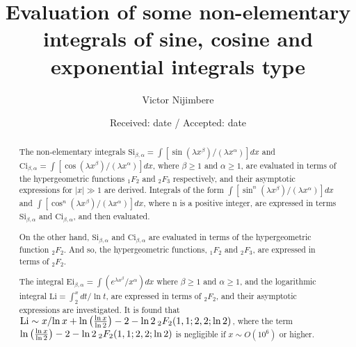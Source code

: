 \documentclass[smallextended]{svjour3}
\begin{document}
\title{Evaluation of some non-elementary integrals of sine, cosine and exponential integrals type}



\author{Victor Nijimbere}



\date{Received: date / Accepted: date}


\maketitle

\begin{abstract}
The non-elementary integrals $\text{Si}_{\beta,\alpha}=\int [\sin{(\lambda x^\beta)}/(\lambda x^\alpha)] dx$ and $\text{Ci}_{\beta,\alpha}=\int [\cos{(\lambda x^\beta)}/(\lambda x^\alpha)] dx$, where $\beta\ge1$ and $\alpha\ge1$, are evaluated in terms of the hypergeometric functions $_{1}F_2$ and $_{2}F_3$ respectively, and their asymptotic expressions for $|x|\gg1$ are derived. Integrals of the form $\int [\sin^n{(\lambda x^\beta)}/(\lambda x^\alpha)] dx$ and $\int [\cos^n{(\lambda x^\beta)}/(\lambda x^\alpha)] dx$, where n is a positive integer, are expressed in terms $\text{Si}_{\beta,\alpha}$ and $\text{Ci}_{\beta,\alpha}$, and then evaluated.

On the other hand, $\text{Si}_{\beta,\alpha}$ and $\text{Ci}_{\beta,\alpha}$ are evaluated in terms of the hypergeometric function $_{2}F_2$. And so, the hypergeometric functions, $_{1}F_2$ and $_{2}F_3$, are expressed in terms of $_{2}F_2$.

The integral $\text{Ei}_{\beta,\alpha}=\int (e^{\lambda x^\beta}/x^\alpha) dx$ where $\beta\ge1$ and $\alpha\ge1$, and the logarithmic integral $\text{Li}=\int_{2}^{x} dt/\ln{t}$, are expressed in terms of $_{2}F_2$, and their asymptotic expressions are investigated. It is found that $\text{Li}\sim {x}/{\ln{x}}+\ln{\left(\frac{\ln{x}}{\ln{2}}\right)}-2-
\ln{2}\hspace{.075cm} _{2}F_{2}(1,1;2,2;\ln{2})$, where the term $\ln{\left(\frac{\ln{x}}{\ln{2}}\right)}-2-
\ln{2}\hspace{.075cm} _{2}F_{2}(1,1;2,2;\ln{2})$ is negligible if $x\sim O(10^6)$ or higher.

\end{abstract}
\end{document}
